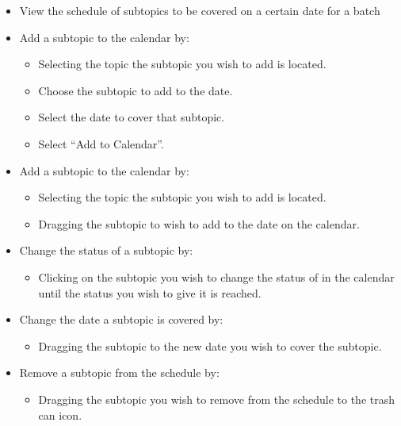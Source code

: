 \begin{itemize}
    \item View the schedule of subtopics to be covered on a certain date for a batch
    \item Add a subtopic to the calendar by:
    \begin{itemize}
        \item Selecting the topic the subtopic you wish to add is located.
        \item Choose the subtopic to add to the date.
        \item Select the date to cover that subtopic.
        \item Select “Add to Calendar”.
    \end{itemize}
        
    \item Add a subtopic to the calendar by:
    \begin{itemize}
        \item Selecting the topic the subtopic you wish to add is located.
        \item Dragging the subtopic to wish to add to the date on the calendar.
    \end{itemize}
        
    \item Change the status of a subtopic by:
    \begin{itemize}
        \item Clicking on the subtopic you wish to change the status of in the calendar until the status you wish to give it is reached.
    \end{itemize}
    \item Change the date a subtopic is covered by:
    \begin{itemize}
        \item Dragging the subtopic to the new date you wish to cover the subtopic.
    \end{itemize}
    \item Remove a subtopic from the schedule by:
    \begin{itemize}
        \item Dragging the subtopic you wish to remove from the schedule to the trash can icon.
    \end{itemize}
\end{itemize}

